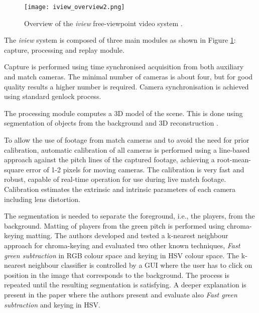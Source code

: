 \begin{figure}[htbp]
\centerline{\texttt{[image: iview\_overview2.png]}}
\caption{Overview of the \textit{iview} free-viewpoint video system \cite{02_iview}.}
\label{fig:iview_overview}
\end{figure}


The \textit{iview} system is composed of three main modules as shown in Figure \ref{fig:iview_overview}: 
capture, processing and replay module.

Capture is performed using time synchronised acquisition from both auxiliary and
match cameras.
The minimal number of cameras is about four, but for good quality results a higher number is required.
Camera synchronisation is achieved using standard genlock process.

The processing module computes a 3D model of the scene.
This is done using segmentation of objects from the background and 3D reconstruction \cite{2.1_iview}.

To allow the use of footage from match cameras and to avoid the need for prior calibration, 
automatic calibration of all cameras is performed using a line-based approach against the pitch lines of the captured footage, 
achieving a root-mean-square error of 1-2 pixels for moving cameras. 
The calibration is very fast and robust, capable of real-time operation for use during live match footage. 
Calibration estimates the extrinsic and intrinsic parameters of each camera including lens distortion.

The segmentation is needed to separate the foreground, i.e., the players, from the background.
Matting of players from the green pitch is performed using chroma-keying matting. 
The authors developed and tested a k-nearest neighbour approach for chroma-keying and evaluated two other known techniques,
\textit{Fast green subtraction} in RGB colour space and keying in HSV colour space.
The k-nearest neighbour classifier is controlled by a GUI where the user has to click on position in the image that corresponds
to the background. 
The process is repeated until the resulting segmentation is satisfying.
A deeper explanation is present in the paper \cite{2.1_iview} where the authors present and evaluate also 
\textit{Fast green subtraction} and keying in HSV.

